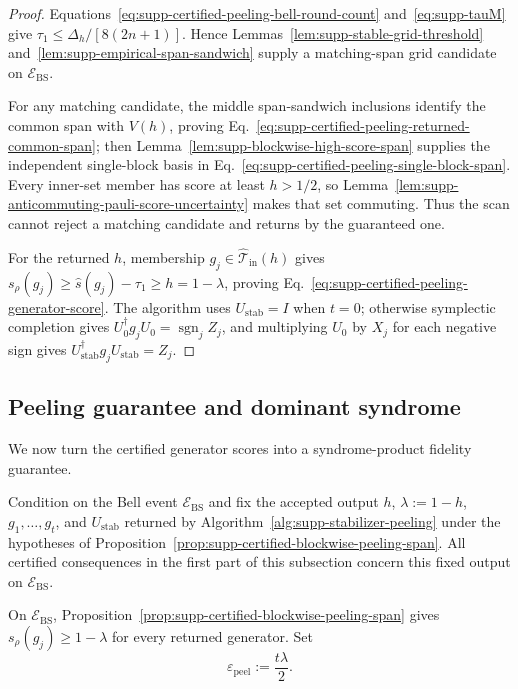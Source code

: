 \documentclass[
  aps,
  prx,
  reprint,
  superscriptaddress,
  amsmath,
  amssymb,
  nofootinbib,
  longbibliography
]{revtex4-2}
\begin{document}
\begin{proof}
Equations~\eqref{eq:supp-certified-peeling-bell-round-count}
and~\eqref{eq:supp-tauM} give
$\tau_1\le\Delta_h/[8(2n+1)]$.  Hence
Lemmas~\ref{lem:supp-stable-grid-threshold}
and~\ref{lem:supp-empirical-span-sandwich} supply a matching-span grid
candidate on $\mathcal E_{\mathrm{BS}}$.

For any matching candidate, the middle span-sandwich inclusions identify the
common span with $V(h)$, proving
Eq.~\eqref{eq:supp-certified-peeling-returned-common-span}; then
Lemma~\ref{lem:supp-blockwise-high-score-span} supplies the independent
single-block basis in
Eq.~\eqref{eq:supp-certified-peeling-single-block-span}.  Every inner-set
member has score at least $h>1/2$, so
Lemma~\ref{lem:supp-anticommuting-pauli-score-uncertainty} makes that set
commuting.  Thus the scan cannot reject a matching candidate and returns by
the guaranteed one.

For the returned $h$, membership
$g_j\in\widehat{\mathcal T}_{\mathrm{in}}(h)$ gives
$s_\rho(g_j)\ge\hat s(g_j)-\tau_1\ge h=1-\lambda$, proving
Eq.~\eqref{eq:supp-certified-peeling-generator-score}.  The algorithm uses
$U_{\mathrm{stab}}=I$ when $t=0$; otherwise symplectic completion gives
$U_0^\dagger g_jU_0=\operatorname{sgn}_jZ_j$, and multiplying $U_0$ by
$X_j$ for each negative sign gives
$U_{\mathrm{stab}}^\dagger g_jU_{\mathrm{stab}}=Z_j$.
\end{proof}

\subsection{Peeling guarantee and dominant syndrome}
\label{sec:supp-peeling-guarantee-syndrome-recovery}

We now turn the certified generator scores into a syndrome-product fidelity
guarantee.

Condition on the Bell event $\mathcal E_{\mathrm{BS}}$ and fix the accepted
output $h$, $\lambda:=1-h$, $g_1,\dots,g_t$, and
$U_{\mathrm{stab}}$ returned by
Algorithm~\ref{alg:supp-stabilizer-peeling} under the hypotheses of
Proposition~\ref{prop:supp-certified-blockwise-peeling-span}.  All certified
consequences in the first part of this subsection concern this fixed output
on $\mathcal E_{\mathrm{BS}}$.

On $\mathcal E_{\mathrm{BS}}$,
Proposition~\ref{prop:supp-certified-blockwise-peeling-span} gives
$s_\rho(g_j)\ge1-\lambda$ for every returned generator.  Set
\begin{equation}
\varepsilon_{\mathrm{peel}}
:=
\frac{t\lambda}{2}.
\label{eq:supp-eps-peel}
\end{equation}
\end{document}
